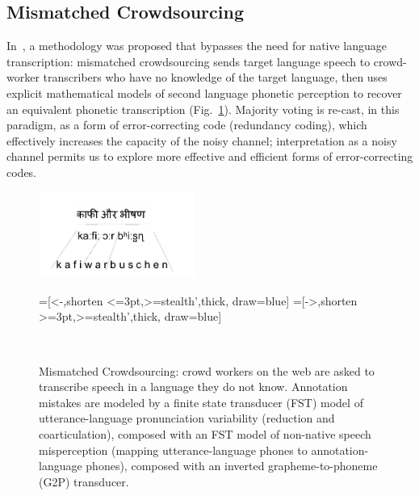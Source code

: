 \subsection{Mismatched Crowdsourcing}
\label{sec:bgmc}

In~\cite{JHJ15a}, a methodology was proposed that bypasses the need
for native language transcription: mismatched crowdsourcing sends target
language speech to crowd-worker transcribers who have no
knowledge of the target language, then uses explicit mathematical
models of second language phonetic perception to recover an equivalent
phonetic transcription (Fig.~\ref{fig:h2e_eg2}).  Majority voting is
re-cast, in this paradigm, as a form of error-correcting code
(redundancy coding), which effectively increases the capacity of the
noisy channel; interpretation as a noisy channel permits us to explore
more effective and efficient forms of error-correcting codes.

\begin{figure}[b!]\setlength{\textfloatsep}{3mm}
\centerline{\includegraphics[width=2in]{../figs/h2e_eg1.png}}
\begin{center}
  =[<-,shorten <=3pt,>=stealth',thick, draw=blue]
  =[->,shorten >=3pt,>=stealth',thick, draw=blue]
  \\
\end{center}
\setlength{\abovecaptionskip}{0pt}
\caption{Mismatched Crowdsourcing: crowd workers on the web are asked
  to transcribe speech in a language they do not know.  Annotation
  mistakes are modeled by a finite state transducer (FST) model of
  utterance-language pronunciation variability (reduction and
  coarticulation), composed with an FST model of non-native speech
  misperception (mapping utterance-language phones to
  annotation-language phones), composed with an inverted
  grapheme-to-phoneme (G2P) transducer.}
\label{fig:h2e_eg2}
\end{figure}


